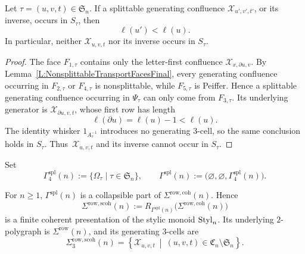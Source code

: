 \documentclass[a4paper, twoside, 11pt, english]{article}
\begin{document}
\begin{proposition}
\label{P:StrictDescentSplittableDependenciesFinal}
Let $\tau=(u,v,t)\in\mathfrak S_n$. If a splittable generating
confluence $\mathcal X_{u',v',t'}$, or its inverse, occurs in
$S_\tau$, then
\[
\ell(u')<\ell(u).
\]
In particular, neither $\mathcal X_{u,v,t}$ nor its inverse occurs
in $S_\tau$.
\end{proposition}

\begin{proof}
The face $F_{1,\tau}$ contains only the letter-first confluence
$\mathcal X_{x,\partial u,v}$. By
Lemma~\ref{L:NonsplittableTransportFacesFinal}, every generating
confluence occurring in $F_{2,\tau}$ or $F_{4,\tau}$ is
nonsplittable, while $F_{5,\tau}$ is Peiffer. Hence a splittable
generating confluence occurring in $\Psi_\tau$ can only come from
$F_{3,\tau}$. Its underlying generator is
$\mathcal X_{\partial u,v,t}$, whose first row has length
\[
\ell(\partial u)=\ell(u)-1<\ell(u).
\]
The identity whisker $1_{A_\tau^{-1}}$ introduces no generating
$3$-cell, so the same conclusion holds in
$S_\tau$.
Thus~$\mathcal X_{u,v,t}$ and its inverse cannot occur in $S_\tau$.
\end{proof}


Set
\[
\Gamma_4^{\mathrm{spl}}(n)
:=
\{\Omega_\tau\mid\tau\in\mathfrak S_n\},
\qquad
\Gamma^{\mathrm{spl}}(n)
:=
\bigl(
\varnothing,
\varnothing,
\Gamma_4^{\mathrm{spl}}(n)
\bigr).
\]

\begin{theorem}
\label{T:FirstSplittableReductionFinal}
For  $n\geq1$, $\Gamma^{\mathrm{spl}}(n)$ is a collapsible part of
$\Sigma^{\mathrm{row,coh}}(n)$. Hence
\[
\Sigma^{\mathrm{row,scoh}}(n)
:=
R_{\Gamma^{\mathrm{spl}}(n)}
\bigl(
\Sigma^{\mathrm{row,coh}}(n)
\bigr)
\]
is a finite coherent presentation of the stylic monoid $\mathrm{Styl}_n$.
Its underlying $2$-polygraph is $\Sigma^{\mathrm{row}}(n)$, and its
generating $3$-cells are
\[
\Sigma^{\mathrm{row,scoh}}_3(n)
=
\left\{
\mathcal X_{u,v,t}
\ \middle|\
(u,v,t)\in
\mathfrak C_n\setminus\mathfrak S_n
\right\}.
\]
\end{theorem}
\end{document}
